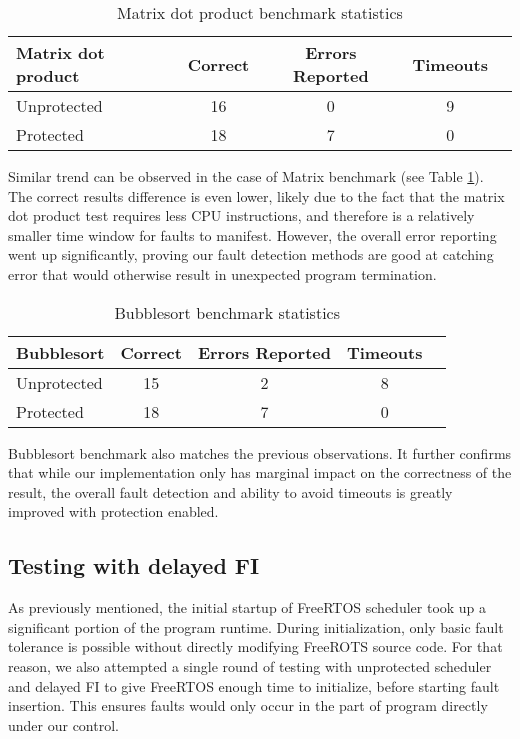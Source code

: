 \begin{table}[h]
\centering
\begin{tabular}{|l|c|c|c|c|}
\hline
\textbf{Matrix dot product} & \textbf{Correct} & \textbf{Errors Reported} & \textbf{Timeouts} \\
\hline
Unprotected & 16 & 0 & 9 \\
Protected & 18 & 7 & 0 \\
\hline
\end{tabular}
\caption{Matrix dot product benchmark statistics}
\label{tab:matrix_bench}
\end{table}

Similar trend can be observed in the case of Matrix benchmark (see Table \ref{tab:matrix_bench}). The correct results difference is even lower, likely due to the fact that the matrix dot product test requires less CPU instructions, and therefore is a relatively smaller time window for faults to manifest. However, the overall error reporting went up significantly, proving our fault detection methods are good at catching error that would otherwise result in unexpected program termination.

\begin{table}[h]
\centering
\begin{tabular}{|l|c|c|c|c|}
\hline
\textbf{Bubblesort} & \textbf{Correct} & \textbf{Errors Reported} & \textbf{Timeouts} \\
\hline
Unprotected & 15 & 2 & 8 \\
Protected & 18 & 7 & 0 \\
\hline
\end{tabular}
\caption{Bubblesort benchmark statistics}
\label{tab:bubblesort_bench}
\end{table}

Bubblesort benchmark also matches the previous observations. It further confirms that while our implementation only has marginal impact on the correctness of the result, the overall fault detection and ability to avoid timeouts is greatly improved with protection enabled.

\subsection{Testing with delayed FI}

As previously mentioned, the initial startup of FreeRTOS scheduler took up a significant portion of the program runtime. During initialization, only basic fault tolerance is possible without directly modifying FreeROTS source code. For that reason, we also attempted a single round of testing with unprotected scheduler and delayed FI to give FreeRTOS enough time to initialize, before starting fault insertion. This ensures faults would only occur in the part of program directly under our control.

